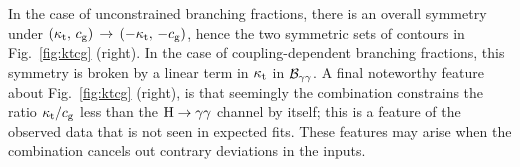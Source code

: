 % 
In the case of unconstrained branching fractions, there is an overall symmetry under $(\kappa_{\mathrm{t}},\,c_\mathrm{g}) \, \to \, (-\kappa_{\mathrm{t}},\,-c_\mathrm{g})$, hence the two symmetric sets of contours in Fig.~\ref{fig:ktcg} (right).
% 
In the case of coupling-dependent branching fractions, this symmetry is broken by a linear term in $\kappa_{\mathrm{t}}$ in $\mathcal{B}_{\mathrm{\gamma}\mathrm{\gamma}}$.
% 
A final noteworthy feature about Fig.~\ref{fig:ktcg} (right), is that seemingly the combination constrains the ratio $\kappa_{\mathrm{t}} / c_\mathrm{g}$ less than the $\mathrm{H}\to\mathrm{\gamma}\mathrm{\gamma}$ channel by itself; this is a feature of the observed data that is not seen in expected fits.
% 
These features may arise when the combination cancels out contrary deviations in the inputs.


\begin{figure}[hbtp]
  \begin{center}
\end{center}
\end{figure}
